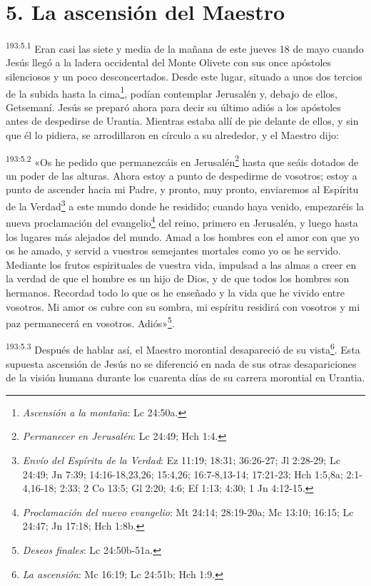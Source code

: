 \section*{5. La ascensión del Maestro}
\par 
\textsuperscript{193:5.1} Eran casi las siete y media de la mañana de este jueves 18 de mayo cuando Jesús llegó a la ladera occidental del Monte Olivete con sus once apóstoles silenciosos y un poco desconcertados. Desde este lugar, situado a unos dos tercios de la subida hasta la cima\footnote{\textit{Ascensión a la montaña}: Lc 24:50a.}, podían contemplar Jerusalén y, debajo de ellos, Getsemaní. Jesús se preparó ahora para decir su último adiós a los apóstoles antes de despedirse de Urantia. Mientras estaba allí de pie delante de ellos, y sin que él lo pidiera, se arrodillaron en círculo a su alrededor, y el Maestro dijo:

\par 
\textsuperscript{193:5.2} «Os he pedido que permanezcáis en Jerusalén\footnote{\textit{Permanecer en Jerusalén}: Lc 24:49; Hch 1:4.} hasta que seáis dotados de un poder de las alturas. Ahora estoy a punto de despedirme de vosotros; estoy a punto de ascender hacia mi Padre, y pronto, muy pronto, enviaremos al Espíritu de la Verdad\footnote{\textit{Envío del Espíritu de la Verdad}: Ez 11:19; 18:31; 36:26-27; Jl 2:28-29; Lc 24:49; Jn 7:39; 14:16-18,23,26; 15:4,26; 16:7-8,13-14; 17:21-23; Hch 1:5,8a; 2:1-4,16-18; 2:33; 2 Co 13:5; Gl 2:20; 4:6; Ef 1:13; 4:30; 1 Jn 4:12-15.} a este mundo donde he residido; cuando haya venido, empezaréis la nueva proclamación del evangelio\footnote{\textit{Proclamación del nuevo evangelio}: Mt 24:14; 28:19-20a; Mc 13:10; 16:15; Lc 24:47; Jn 17:18; Hch 1:8b.} del reino, primero en Jerusalén, y luego hasta los lugares más alejados del mundo. Amad a los hombres con el amor con que yo os he amado, y servid a vuestros semejantes mortales como yo os he servido. Mediante los frutos espirituales de vuestra vida, impulsad a las almas a creer en la verdad de que el hombre es un hijo de Dios, y de que todos los hombres son hermanos. Recordad todo lo que os he enseñado y la vida que he vivido entre vosotros. Mi amor os cubre con su sombra, mi espíritu residirá con vosotros y mi paz permanecerá en vosotros. Adiós»\footnote{\textit{Deseos finales}: Lc 24:50b-51a.}.

\par 
\textsuperscript{193:5.3} Después de hablar así, el Maestro morontial desapareció de su vista\footnote{\textit{La ascensión}: Mc 16:19; Lc 24:51b; Hch 1:9.}. Esta supuesta ascensión de Jesús no se diferenció en nada de sus otras desapariciones de la visión humana durante los cuarenta días de su carrera morontial en Urantia.

